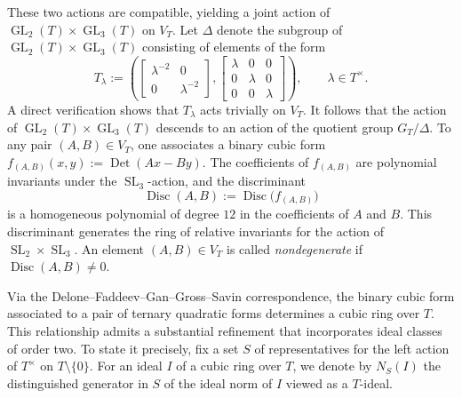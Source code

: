 \documentclass[table]{amsart}
\newcommand{\op}[1]{\operatorname{#1}}
\numberwithin{equation}{section}
\begin{document}
These two actions are compatible, yielding a joint action of
\(\op{GL}_2(T)\times \op{GL}_3(T)\) on \(V_T\). Let \(\Delta\) denote the subgroup
of \(\op{GL}_2(T)\times \op{GL}_3(T)\) consisting of elements of the form
\[
T_\lambda :=
\left(
\begin{bmatrix}
\lambda^{-2} & 0\\
0 & \lambda^{-2}
\end{bmatrix},
\begin{bmatrix}
\lambda & 0 & 0\\
0 & \lambda & 0\\
0 & 0 & \lambda
\end{bmatrix}
\right),
\qquad \lambda\in T^{\times}.
\]
A direct verification shows that \(T_\lambda\) acts trivially on \(V_T\). It
follows that the action of \(\op{GL}_2(T)\times \op{GL}_3(T)\) descends to an
action of the quotient group $G_T/\Delta$. To any pair \((A,B)\in V_T\), one associates a binary cubic form $f_{(A,B)}(x,y) := \op{Det}(Ax - By)$.
The coefficients of \(f_{(A,B)}\) are polynomial invariants under the
\(\op{SL}_3\)-action, and the discriminant
\[
\op{Disc}(A,B) := \op{Disc}\bigl(f_{(A,B)}\bigr)
\]
is a homogeneous polynomial of degree \(12\) in the coefficients of \(A\) and
\(B\). This discriminant generates the ring of relative invariants for the
action of \(\op{SL}_2\times \op{SL}_3\). An element \((A,B)\in V_T\) is called
\emph{nondegenerate} if \(\op{Disc}(A,B)\neq 0\).


\par
Via the Delone--Faddeev--Gan--Gross--Savin correspondence, the binary cubic form
associated to a pair of ternary quadratic forms determines a cubic ring over
\(T\). This relationship admits a substantial refinement that incorporates ideal
classes of order two. To state it precisely, fix a set \(S\) of representatives
for the left action of \(T^{\times}\) on \(T\setminus\{0\}\). For an ideal \(I\) of a
cubic ring over \(T\), we denote by \(N_{S}(I)\) the distinguished generator in
\(S\) of the ideal norm of \(I\) viewed as a \(T\)-ideal. 
\end{document}
